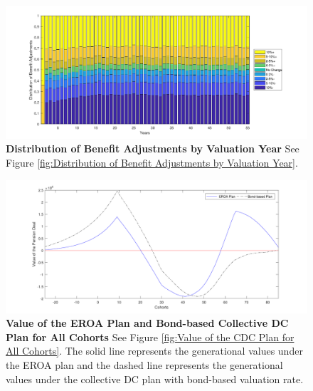 \documentclass{sfuthesis}
\numberwithin{equation}{chapter}
\begin{document}
    
    	\begin{figure}[H]
			\includegraphics[width=1\linewidth]{ResultPlot/ProbIncDc1.pdf} 
			\caption[Distribution of Benefit Adjustments by Valuation Year]{\textbf{Distribution of Benefit Adjustments by Valuation Year}
			\newline\footnotesize\justify See Figure \ref{fig:Distribution of Benefit Adjustments by Valuation Year}.}
			\label{fig:Distribution of Benefit Adjustments by Valuation Year 2}	
		\end{figure}
		\vspace{-0.3cm}
		\begin{figure}[h]
			\includegraphics[width=1\linewidth]{ResultPlot/VPension1.pdf} 
			\caption[Value of the EROA Plan and Bond-based Collective DC Plan for All Cohorts]{\textbf{Value of the EROA Plan and Bond-based Collective DC Plan for All Cohorts}
			\vspace{-0.4cm}
			\newline\footnotesize\justify See Figure \ref{fig:Value of the CDC Plan for All Cohorts}. The solid line represents the generational values under the EROA plan and the dashed line represents the generational values under the collective DC plan with bond-based valuation rate.}
			\label{fig:Value of the EROA Plan for All Cohorts}
		\end{figure}
	
\end{document}
